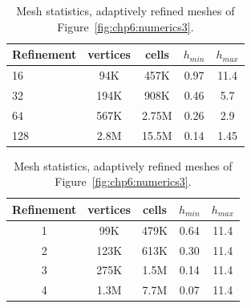 \begin{table}%
  \label{chp6:meshstat}
  \centering
  \begin{minipage}{.45\textwidth}%
    \begin{tabular}{l|cccc}
	    Refinement & vertices & cells     & $h_{min}$ & $h_{max}$ \\ \hline
	     16 & 94K & 457K & 0.97 & 11.4 \\  
	     32 & 194K & 908K &  0.46 & 5.7 \\  
	     64 & 567K &  2.75M & 0.26 & 2.9 \\
	     128 &  2.8M & 15.5M &  0.14 & 1.45

    \end{tabular}
    \caption{Mesh statistics, uniformly refined meshes of Figure~\ref{fig:chp6:numerics2}.}
    \label{tab:uniref}
  \end{minipage}%
    \qquad
  \begin{minipage}{.45\textwidth}%
    \begin{tabular}{c|cccc}
	    Refinement & vertices & cells     & $h_{min}$ & $h_{max}$ \\ \hline
	     1 & 99K &  479K &  0.64 &  11.4 \\
	     2 & 123K& 613K & 0.30 &  11.4 \\
	     3 & 275K &  1.5M  &  0.14 & 11.4 \\
	     4 & 1.3M &  7.7M  & 0.07 &  11.4 \\
    \end{tabular}
    \caption{Mesh statistics, adaptively refined meshes of Figure~\ref{fig:chp6:numerics3}.}
    \label{tab:localref}
  \end{minipage}%
  \qquad

\end{table}

